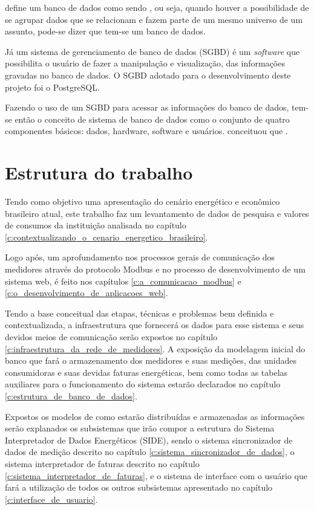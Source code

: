  define um banco de dados como sendo , ou seja, quando houver a possibilidade de se agrupar dados que se relacionam e fazem parte de um mesmo universo de um assunto, pode-se dizer que tem-se um banco de dados.

Já um sistema de gerenciamento de banco de dados (SGBD) é um \textit{software} que possibilita o usuário de fazer a manipulação e visualização, das informações gravadas no banco de dados. O SGBD adotado para o desenvolvimento deste projeto foi o PostgreSQL.

Fazendo o uso de um SGBD para acessar as informações do banco de dados, tem-se então o conceito de sistema de banco de dados como o conjunto de quatro componentes básicos: dados, hardware, software e usuários. \cite{date2004} conceituou que .


\section{Estrutura do trabalho}

Tendo como objetivo uma apresentação do cenário energético e econômico brasileiro atual, este trabalho faz um levantamento de dados de pesquisa e valores de consumos da instituição analisada no capítulo \ref{c:contextualizando_o_cenario_energetico_brasileiro}.

Logo após, um aprofundamento nos processos gerais de comunicação dos medidores através do protocolo Modbus e no processo de desenvolvimento de um sistema web, é feito nos capítulos \ref{c:a_comunicacao_modbus} e \ref{c:o_desenvolvimento_de_aplicacoes_web}.

Tendo a base conceitual das etapas, técnicas e problemas bem definida e contextualizada, a infraestrutura que fornecerá os dados para esse sistema e seus devidos meios de comunicação serão expostos no capítulo \ref{c:infraestrutura_da_rede_de_medidores}.
A exposição da modelagem inicial do banco que fará o armazenamento dos medidores e suas medições, das unidades consumidoras e suas devidas faturas energéticas, bem como todas as tabelas auxiliares para o funcionamento do sistema estarão declarados no capítulo \ref{c:estrutura_de_banco_de_dados}.

Expostos os modelos de como estarão distribuídas e armazenadas as informações serão explanados os subsistemas que irão compor a estrutura do Sistema Interpretador de Dados Energéticos (SIDE), sendo o sistema sincronizador de dados de medição descrito no capítulo \ref{c:sistema_sincronizador_de_dados}, o sistema interpretador de faturas descrito no capítulo \ref{c:sistema_interpretador_de_faturas}, e o sistema de interface com o usuário que fará a utilização de todos os outros subsistemas apresentado no capítulo \ref{c:interface_de_usuario}.

